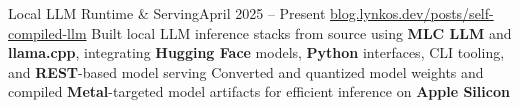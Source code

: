 
\subheading
    {Local LLM Runtime \& Serving}{April 2025 -- Present}
    {\href{https://blog.lynkos.dev/posts/self-compiled-llm}{blog.lynkos.dev/posts/self-compiled-llm}}{}
    \itemListStart
    \listItem{}
        {Built local LLM inference stacks from source using \textbf{MLC LLM} and \textbf{llama.cpp}, integrating \textbf{Hugging Face} models, \textbf{Python} interfaces, CLI tooling, and \textbf{REST}-based model serving}
    \listItem{}
        {Converted and quantized model weights and compiled \textbf{Metal}-targeted model artifacts for efficient inference on \textbf{Apple Silicon}}
    \itemListEnd